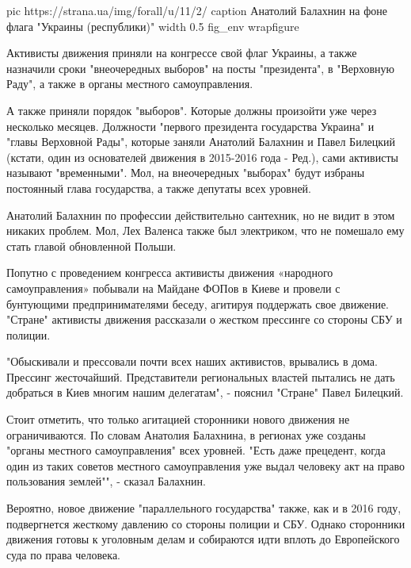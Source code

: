 \ifcmt
  pic https://strana.ua/img/forall/u/11/2/%
  caption Анатолий Балахнин на фоне флага "Украины (республики)"
  width 0.5
  fig_env wrapfigure
\fi

Активисты движения приняли на конгрессе свой флаг Украины, а также
назначили сроки "внеочередных выборов" на посты "президента", в "Верховную
Раду", а также в органы местного самоуправления.

А также приняли порядок "выборов". Которые должны произойти уже через
несколько месяцев. Должности "первого президента государства Украина" и
"главы Верховной Рады", которые заняли Анатолий Балахнин и Павел Билецкий
(кстати, один из основателей движения в 2015-2016 года - Ред.), сами
активисты называют "временными". Мол, на внеочередных "выборах" будут
избраны постоянный глава государства, а также депутаты всех уровней.

Анатолий Балахнин по профессии действительно сантехник, но не видит в этом
никаких проблем. Мол, Лех Валенса также был электриком, что не помешало
ему стать главой обновленной Польши. 

Попутно с проведением конгресса активисты движения «народного
самоуправления» побывали на Майдане ФОПов в Киеве и провели с бунтующими
предпринимателями беседу, агитируя поддержать свое движение. "Стране"
активисты движения рассказали о жестком прессинге со стороны СБУ и
полиции.

"Обыскивали и прессовали почти всех наших активистов, врывались в дома.
Прессинг жесточайший. Представители региональных властей пытались не дать
добраться в Киев многим нашим делегатам", - пояснил "Стране" Павел
Билецкий.

Стоит отметить, что только агитацией сторонники нового движения не
ограничиваются. По словам Анатолия Балахнина, в регионах уже созданы
"органы местного самоуправления" всех уровней. "Есть даже прецедент, когда
один из таких советов местного самоуправления уже выдал человеку акт на
право пользования землей"", - сказал Балахнин.

Вероятно, новое движение "параллельного государства" также, как и в 2016
году, подвергнется жесткому давлению со стороны полиции и СБУ. Однако
сторонники движения готовы к уголовным делам и собираются идти вплоть до
Европейского суда по права человека.
